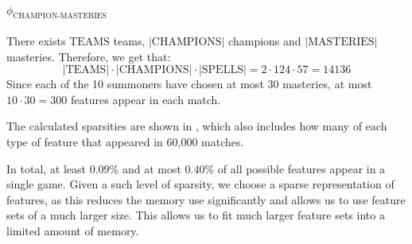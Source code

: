 \paragraph{$\phi_{\text{CHAMPION-MASTERIES}}$}
\begin{adjustwidth}{2cm}{}
There exists $\text{TEAMS}$ teams, $|\text{CHAMPIONS}|$ champions and $|\text{MASTERIES}|$ masteries. Therefore, we get that:
\[|\text{TEAMS}| \cdot |\text{CHAMPIONS}| \cdot |\text{SPELLS}| = 2 \cdot 124 \cdot 57 = 14136\]
Since each of the 10 summoners have chosen at most 30 masteries, at most $10 \cdot 30 = 300$ features appear in each match.
\end{adjustwidth}

  \begin{table}[!htb]
    \centering
    \caption{The sparsity of each type of feature. (*)At most.}\label{tab:featuresparsity}
  \end{table}

The calculated sparsities are shown in , which also includes how many of each type of feature that appeared in 60,000 matches.

In total, at least $0.09 \%$ and at most $0.40\%$ of all possible features appear in a single game. Given a such level of sparsity, we choose a sparse representation of features, as this reduces the memory use significantly and allows us to use feature sets of a much larger size. This allows us to fit much larger feature sets into a limited amount of memory.